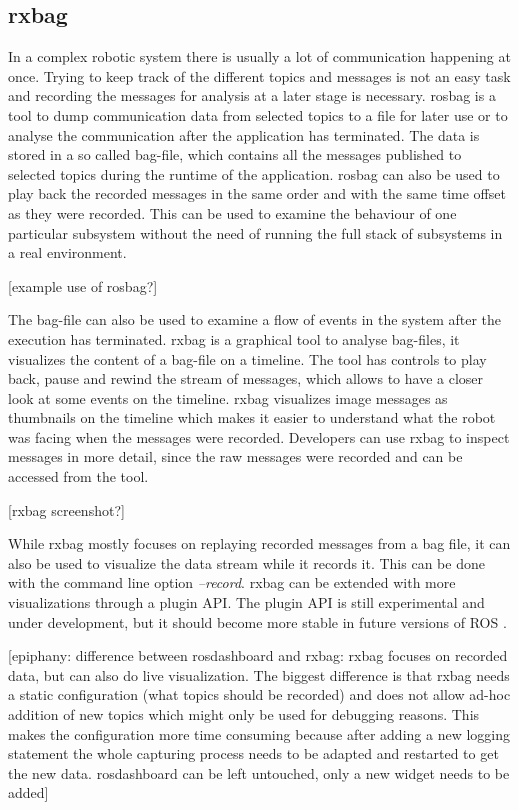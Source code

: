 \subsection{rxbag}
In a complex robotic system there is usually a lot of communication happening at once. Trying to keep track of the different topics and messages is not an easy task and recording the messages for analysis at a later stage is necessary. rosbag is a tool to dump communication data from selected topics to a file for later use or to analyse the communication after the application has terminated. The data is stored in a so called bag-file, which contains all the messages published to selected topics during the runtime of the application. rosbag can also be used to play back the recorded messages in the same order and with the same time offset as they were recorded. This can be used to examine the behaviour of one particular subsystem without the need of running the full stack of subsystems in a real environment.

[example use of rosbag?]

The bag-file can also be used to examine a flow of events in the system after the execution has terminated. rxbag is a graphical tool to analyse bag-files, it visualizes the content of a bag-file on a timeline. The tool has controls to play back, pause and rewind the stream of messages, which allows to have a closer look at some events on the timeline. rxbag visualizes image messages as thumbnails on the timeline which makes it easier to understand what the robot was facing when the messages were recorded. Developers can use rxbag to inspect messages in more detail, since the raw messages were recorded and can be accessed from the tool.

[rxbag screenshot?]

While rxbag mostly focuses on replaying recorded messages from a bag file, it can also be used to visualize the data stream while it records it. This can be done with the command line option \emph{--record}. rxbag can be extended with more visualizations through a plugin API. The plugin API is still experimental and under development, but it should become more stable in future versions of ROS \cite{rxbag}.

[epiphany: difference between rosdashboard and rxbag: rxbag focuses on recorded data, but can also do live visualization. The biggest difference is that rxbag needs a static configuration (what topics should be recorded) and does not allow ad-hoc addition of new topics which might only be used for debugging reasons. This makes the configuration more time consuming because after adding a new logging statement the whole capturing process needs to be adapted and restarted to get the new data. rosdashboard can be left untouched, only a new widget needs to be added]

